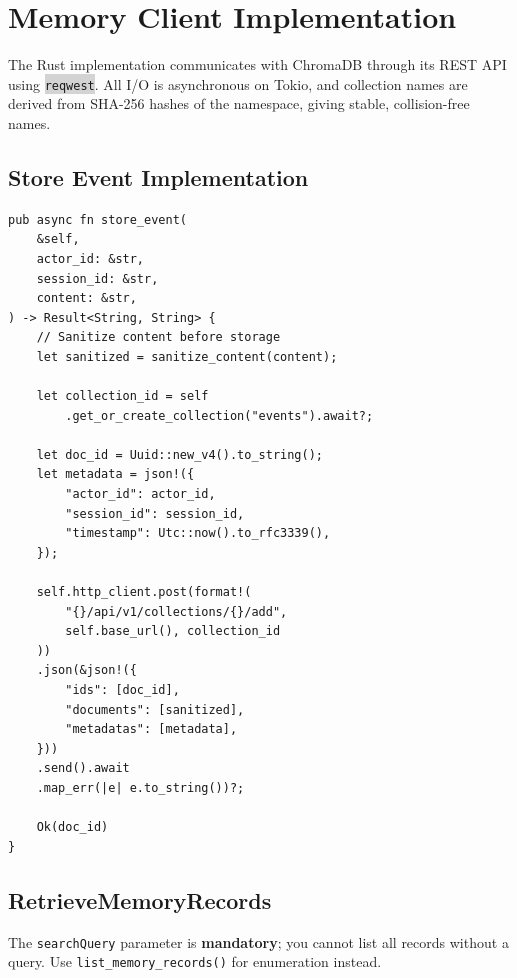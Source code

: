 \documentclass[11pt,letterpaper]{article}
\newcommand{\api}[1]{\texttt{\textcolor{cloudblue}{#1}}}
\newcommand{\code}[1]{\texttt{\small\colorbox{lightgray}{#1}}}
\begin{document}
\section{Memory Client Implementation}

\begin{keybox}
The Rust implementation communicates with ChromaDB through its REST API using \code{reqwest}. All I/O is asynchronous on Tokio, and collection names are derived from SHA-256 hashes of the namespace, giving stable, collision-free names.
\end{keybox}

\subsection{Store Event Implementation}

\begin{lstlisting}[caption={Store event with sanitization (Rust)}]
pub async fn store_event(
    &self,
    actor_id: &str,
    session_id: &str,
    content: &str,
) -> Result<String, String> {
    // Sanitize content before storage
    let sanitized = sanitize_content(content);

    let collection_id = self
        .get_or_create_collection("events").await?;

    let doc_id = Uuid::new_v4().to_string();
    let metadata = json!({
        "actor_id": actor_id,
        "session_id": session_id,
        "timestamp": Utc::now().to_rfc3339(),
    });

    self.http_client.post(format!(
        "{}/api/v1/collections/{}/add",
        self.base_url(), collection_id
    ))
    .json(&json!({
        "ids": [doc_id],
        "documents": [sanitized],
        "metadatas": [metadata],
    }))
    .send().await
    .map_err(|e| e.to_string())?;

    Ok(doc_id)
}
\end{lstlisting}

\subsection{RetrieveMemoryRecords}

\begin{warnbox}
The \api{searchQuery} parameter is \textbf{mandatory}; you cannot list all records without a query. Use \api{list\_memory\_records()} for enumeration instead.
\end{warnbox}
\end{document}
